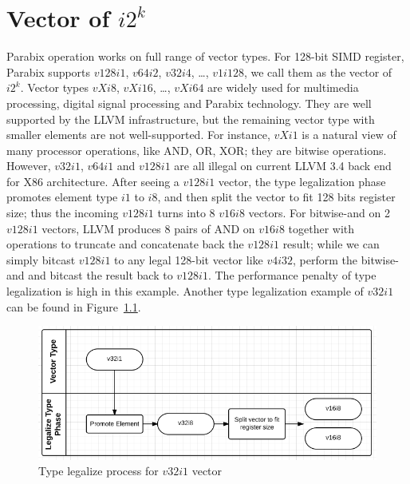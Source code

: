 %
%

\chapter{Vector of $i2^k$}
\label{four}

Parabix operation works on full range of vector types. For 128-bit SIMD register, Parabix supports $v128i1$, $v64i2$, $v32i4$, \ldots, $v1i128$, we call them as the vector of $i2^k$. Vector types $vXi8$, $vXi16$, \ldots, $vXi64$ are widely used for multimedia processing, digital signal processing and Parabix technology. They are well supported by the LLVM infrastructure, but the remaining vector type with smaller elements are not well-supported. For instance, $vXi1$ is a natural view of many processor operations, like AND, OR, XOR; they are bitwise operations. However, $v32i1$, $v64i1$ and $v128i1$ are all illegal on current LLVM 3.4 back end for X86 architecture. After seeing a $v128i1$ vector, the type legalization phase promotes element type $i1$ to $i8$, and then split the vector to fit 128 bits register size; thus the incoming $v128i1$ turns into 8 $v16i8$ vectors. For bitwise-and on 2 $v128i1$ vectors, LLVM produces 8 pairs of AND on $v16i8$ together with operations to truncate and concatenate back the $v128i1$ result; while we can simply bitcast $v128i1$ to any legal 128-bit vector like $v4i32$, perform the bitwise-and and bitcast the result back to $v128i1$. The performance penalty of type legalization is high in this example. Another type legalization example of $v32i1$ can be found in Figure~\ref{figure:v32i1_legalize_type}.

\begin{figure}[ht!]
  \centering
  \includegraphics[width=140mm]{draw/v32i1_legalize_type.png}
  \caption{Type legalize process for $v32i1$ vector}
  \label{figure:v32i1_legalize_type}
\end{figure}

